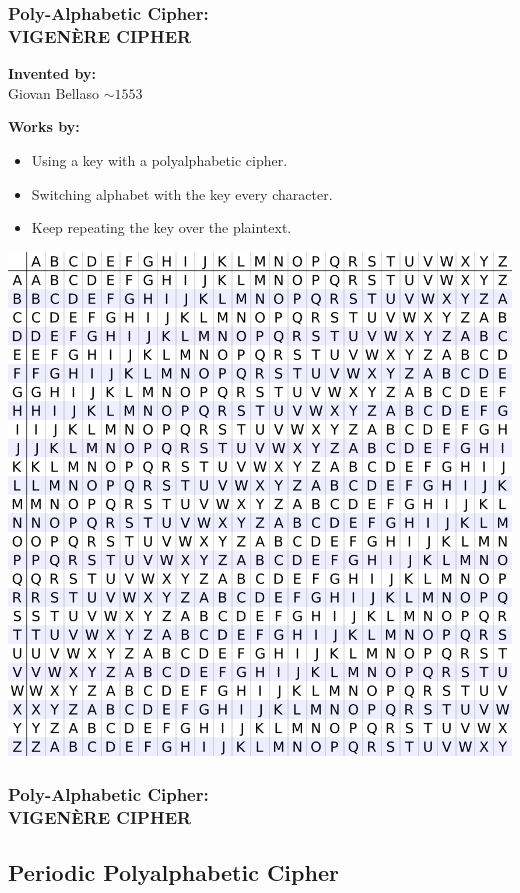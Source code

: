 \documentclass{uva-inf-presentation}
\begin{document}
\begin{frame}
\frametitle{Poly-Alphabetic Cipher:\\ VIGENÈRE CIPHER}
\begin{minipage}{0.55\linewidth}
\textbf{Invented by:}\\
Giovan Bellaso $\sim 1553$

\textbf{Works by:}
\begin{itemize}
\item Using a key with a polyalphabetic cipher.
\item Switching alphabet with the key every character.
\item Keep repeating the key over the plaintext.
\end{itemize}
\end{minipage}%
\begin{minipage}{0.45\linewidth}
\centering
\includegraphics[width=0.95\linewidth]{Vigenere_square_shading} %
\end{minipage}
\end{frame}

\begin{frame}
\frametitle{Poly-Alphabetic Cipher:\\ VIGENÈRE CIPHER}
\end{frame}

\subsection{Periodic Polyalphabetic Cipher}
\frame{\tableofcontents[currentsubsection]}
\end{document}
